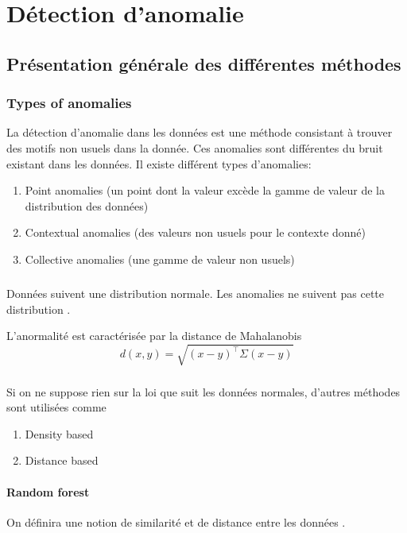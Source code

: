 
\chapter{Détection d'anomalie}

\section{Présentation générale des différentes méthodes}
\subsection{Types of anomalies}
La détection d'anomalie dans les données est une méthode consistant à trouver des motifs non 
usuels dans la donnée. Ces anomalies sont différentes du bruit existant dans les données.
Il existe différent types d'anomalies:
\begin{enumerate}
\item Point anomalies (un point dont la valeur excède la gamme de valeur de la distribution des données)
\item Contextual anomalies (des valeurs non usuels pour le contexte donné)
\item Collective anomalies (une gamme de valeur non usuels)
\end{enumerate}

\paragraph{}
Données suivent une distribution normale.
Les anomalies ne suivent pas cette distribution .

L'anormalité est caractérisée par la distance de Mahalanobis
\begin{equation}
d(x,y) = \sqrt{(x-y)^\top \Sigma (x-y)} 
\end{equation}


\paragraph{}
Si on ne suppose rien sur la loi que suit les données normales, d'autres méthodes sont utilisées comme 

\begin{enumerate}
\item Density based
\item Distance based
\end{enumerate}
\subsubsection{Random forest}
On définira une notion de similarité et de distance entre les données .

